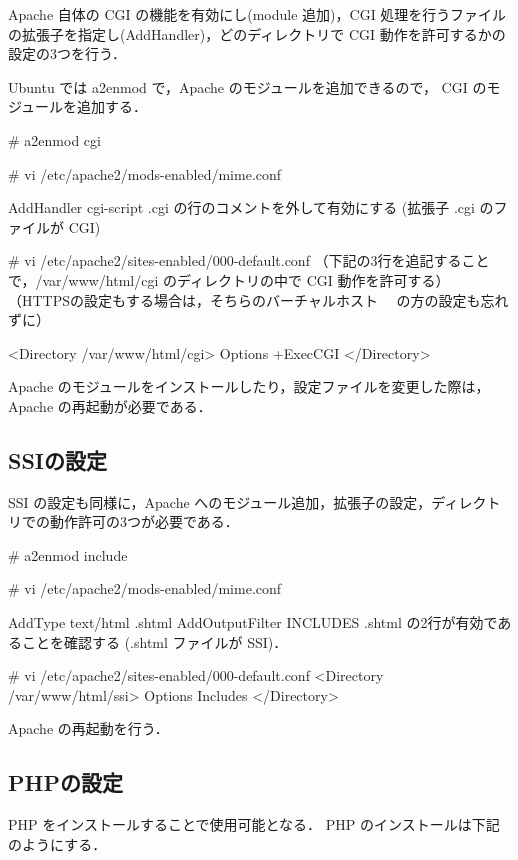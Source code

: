 Apache 自体の CGI の機能を有効にし(module 追加)，CGI 処理を行うファイル
の拡張子を指定し(AddHandler)，どのディレクトリで CGI 動作を許可するかの
設定の3つを行う．

Ubuntu では a2enmod で，Apache のモジュールを追加できるので，
CGI のモジュールを追加する．

\begin{cli}
# a2enmod cgi

# vi /etc/apache2/mods-enabled/mime.conf

AddHandler cgi-script .cgi 
の行のコメントを外して有効にする
(拡張子 .cgi のファイルが CGI)

# vi /etc/apache2/sites-enabled/000-default.conf
（下記の3行を追記することで，/var/www/html/cgi 
  のディレクトリの中で CGI 動作を許可する）
（HTTPSの設定もする場合は，そちらのバーチャルホスト
　の方の設定も忘れずに）

<Directory /var/www/html/cgi>
 Options +ExecCGI
</Directory>

\end{cli}

Apache のモジュールをインストールしたり，設定ファイルを変更した際は，
Apache の再起動が必要である．

\subsection{SSIの設定}

SSI の設定も同様に，Apache へのモジュール追加，拡張子の設定，ディレクト
リでの動作許可の3つが必要である．

\begin{cli}
# a2enmod include

# vi /etc/apache2/mods-enabled/mime.conf

  AddType text/html .shtml
  AddOutputFilter INCLUDES .shtml
の2行が有効であることを確認する (.shtml ファイルが SSI)．

# vi /etc/apache2/sites-enabled/000-default.conf
<Directory /var/www/html/ssi>
        Options Includes
</Directory>

\end{cli}

Apache の再起動を行う．

\subsection{PHPの設定}

PHP をインストールすることで使用可能となる．
PHP のインストールは下記のようにする．

